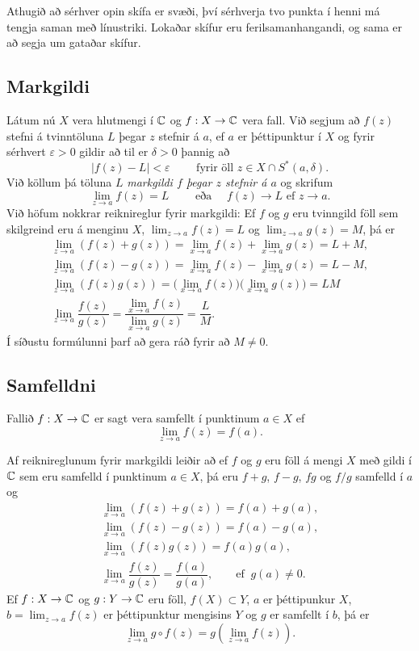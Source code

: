 Athugið að sérhver opin skífa er svæði, því sérhverja tvo punkta í
henni má
tengja saman með línustriki.  Lokaðar skífur eru ferilsamanhangandi,
og sama er að segja um gataðar skífur.


\subsection*{Markgildi}

Látum nú $X$ vera hlutmengi í ${\mathbb C}$ og $f:X\to {\mathbb C}$ vera fall.  Við
segjum að $f(z)$ stefni á tvinntöluna $L$ þegar  $z$ stefnir á $a$, ef $a$ er
þéttipunktur í $X$ og fyrir sérhvert $\varepsilon>0$ gildir að til er
$\delta>0$ þannig að 
$$
|f(z)-L|<\varepsilon \qquad \text{ fyrir öll } z\in X\cap S^*(a,\delta).
$$
Við köllum þá töluna $L$ {\it markgildi $f$ þegar $z$ stefnir á $a$}
og skrifum 
$$
\lim_{z\to a}f(z)=L  \qquad \text{ eða } \quad f(z)\to L \text{ ef }
z\to a.
$$
Við höfum nokkrar reiknireglur fyrir markgildi:  Ef $f$ og $g$ eru
tvinngild föll sem skilgreind eru á menginu $X$, $\lim_{z\to a}f(z)=L$
og $\lim_{z\to a}g(z)=M$, þá er 
\begin{gather*}
\lim_{z\to a}(f(z)+g(z))=\lim_{x\to a}f(z)+\lim_{x\to a}g(z)=L+M,\\
\lim_{z\to a}(f(z)-g(z))=\lim_{x\to a}f(z)-\lim_{x\to a}g(z)=L-M,\\
\lim_{z\to a}(f(z)g(z))=\big(\lim_{x\to a}f(z)\big)\big(\lim_{x\to
a}g(z)\big)=LM\\
\lim_{z\to a}\dfrac{f(z)}{g(z)}=\dfrac{\lim_{x\to a}f(z)}{\lim_{x\to
a}g(z)}=\dfrac LM.
\end{gather*}
Í síðustu formúlunni þarf að gera ráð fyrir að $M\neq 0$.


\subsection*{Samfelldni}

Fallið $f:X\to {\mathbb C}$ er sagt vera samfellt í punktinum $a\in X$ ef
$$
\lim_{z\to a}f(z)=f(a).
$$


Af reiknireglunum fyrir markgildi leiðir að ef $f$ og $g$ eru föll
á mengi $X$ með gildi í ${\mathbb C}$ sem eru samfelld í punktinum $a\in X$, þá
eru $f+g$, $f-g$, $fg$ og $f/g$ samfelld í $a$ og 
\begin{gather*}
\lim_{x\to a}(f(z)+g(z))=f(a)+g(a),\\
\lim_{x\to a}(f(z)-g(z))=f(a)-g(a),\\
\lim_{x\to a}(f(z)g(z))=f(a)g(a),\\
\lim_{x\to a}\dfrac{f(z)}{g(z)}=\dfrac{f(a)}{g(a)}, 
\qquad \text{ef } \ g(a)\neq 0.
\end{gather*}
Ef $f:X\to {\mathbb C}$ og $g:Y\to {\mathbb C}$ eru föll,  $f(X)\subset Y$,
$a$ er þéttipunkur $X$, $b=\lim_{z\to a}f(z)$ er
þéttipunktur mengisins $Y$ og $g$ er samfellt í $b$, þá er
$$
\lim_{z\to a} g\circ f(z)=g(\lim_{z\to a}f(z)).
$$


